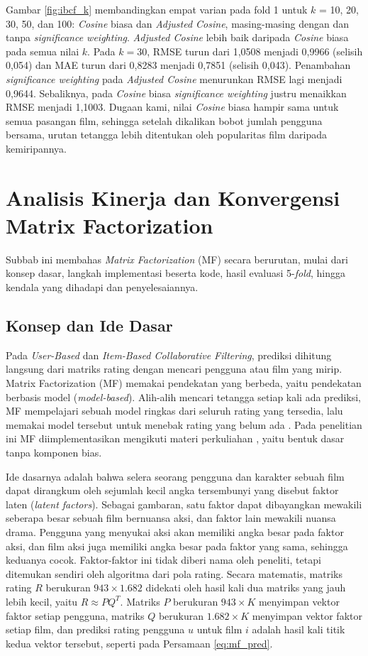 Gambar \ref{fig:ibcf_k} membandingkan empat varian pada fold 1 untuk $k$ = 10, 20, 30, 50, dan 100: \textit{Cosine} biasa dan \textit{Adjusted Cosine}, masing-masing dengan dan tanpa \textit{significance weighting}. \textit{Adjusted Cosine} lebih baik daripada \textit{Cosine} biasa pada semua nilai $k$. Pada $k=30$, RMSE turun dari 1,0508 menjadi 0,9966 (selisih 0,054) dan MAE turun dari 0,8283 menjadi 0,7851 (selisih 0,043). Penambahan \textit{significance weighting} pada \textit{Adjusted Cosine} menurunkan RMSE lagi menjadi 0,9644. Sebaliknya, pada \textit{Cosine} biasa \textit{significance weighting} justru menaikkan RMSE menjadi 1,1003. Dugaan kami, nilai \textit{Cosine} biasa hampir sama untuk semua pasangan film, sehingga setelah dikalikan bobot jumlah pengguna bersama, urutan tetangga lebih ditentukan oleh popularitas film daripada kemiripannya.

\section{Analisis Kinerja dan Konvergensi Matrix Factorization}
\label{sec:mf}
Subbab ini membahas \textit{Matrix Factorization} (MF) secara berurutan, mulai dari konsep dasar, langkah implementasi beserta kode, hasil evaluasi 5-\textit{fold}, hingga kendala yang dihadapi dan penyelesaiannya.

\subsection{Konsep dan Ide Dasar}
Pada \textit{User-Based} dan \textit{Item-Based Collaborative Filtering}, prediksi dihitung langsung dari matriks rating dengan mencari pengguna atau film yang mirip. Matrix Factorization (MF) memakai pendekatan yang berbeda, yaitu pendekatan berbasis model (\textit{model-based}). Alih-alih mencari tetangga setiap kali ada prediksi, MF mempelajari sebuah model ringkas dari seluruh rating yang tersedia, lalu memakai model tersebut untuk menebak rating yang belum ada \citep{koren2009matrix}. Pada penelitian ini MF diimplementasikan mengikuti materi perkuliahan \citep{baizal2024recsys}, yaitu bentuk dasar tanpa komponen bias.

Ide dasarnya adalah bahwa selera seorang pengguna dan karakter sebuah film dapat dirangkum oleh sejumlah kecil angka tersembunyi yang disebut faktor laten (\textit{latent factors}). Sebagai gambaran, satu faktor dapat dibayangkan mewakili seberapa besar sebuah film bernuansa aksi, dan faktor lain mewakili nuansa drama. Pengguna yang menyukai aksi akan memiliki angka besar pada faktor aksi, dan film aksi juga memiliki angka besar pada faktor yang sama, sehingga keduanya cocok. Faktor-faktor ini tidak diberi nama oleh peneliti, tetapi ditemukan sendiri oleh algoritma dari pola rating. Secara matematis, matriks rating $R$ berukuran $943 \times 1.682$ didekati oleh hasil kali dua matriks yang jauh lebih kecil, yaitu $R \approx P Q^T$. Matriks $P$ berukuran $943 \times K$ menyimpan vektor faktor setiap pengguna, matriks $Q$ berukuran $1.682 \times K$ menyimpan vektor faktor setiap film, dan prediksi rating pengguna $u$ untuk film $i$ adalah hasil kali titik kedua vektor tersebut, seperti pada Persamaan \ref{eq:mf_pred}.

